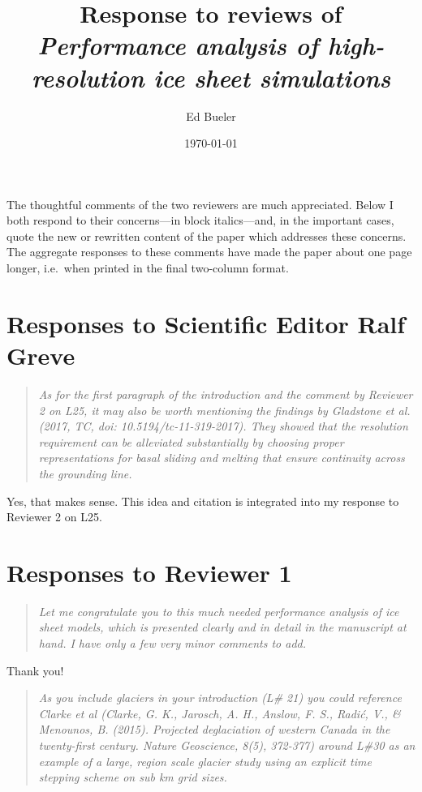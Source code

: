 \documentclass[letterpaper,final,12pt,reqno]{amsart}
\newenvironment{review}%
{\bigskip \par \begin{quote} \selectfont \sl}%
{\end{quote}}
\begin{document}
\title{Response to reviews of \emph{Performance analysis of high-resolution ice sheet simulations}}

\author{Ed Bueler}

\date{\today}

\maketitle


\thispagestyle{empty}

The thoughtful comments of the two reviewers are much appreciated.  Below I both respond to their concerns---in block italics---and, in the important cases, quote the new or rewritten content of the paper which addresses these concerns.  The aggregate responses to these comments have made the paper about one page longer, i.e.~when printed in the final two-column format.

\section{Responses to Scientific Editor Ralf Greve}

\begin{review}
As for the first paragraph of the introduction and the comment by Reviewer 2 on L25, it may also be worth mentioning the findings by Gladstone et al. (2017, TC, doi: 10.5194/tc-11-319-2017). They showed that the resolution requirement can be alleviated substantially by choosing proper representations for basal sliding and melting that ensure continuity across the grounding line.
\end{review}

\noindent Yes, that makes sense.  This idea and citation is integrated into my response to Reviewer 2 on L25.


\section{Responses to Reviewer 1}

\begin{review}
Let me congratulate you to this much needed performance analysis of ice sheet models, which is presented clearly and in detail in the manuscript at hand. I have only a few very minor comments to add.
\end{review}

\noindent Thank you!

\begin{review}
As you include glaciers in your introduction (L\# 21) you could reference Clarke et al (Clarke, G. K., Jarosch, A. H., Anslow, F. S., Radić, V., \& Menounos, B. (2015). Projected deglaciation of western Canada in the twenty-first century. Nature Geoscience, 8(5), 372-377) around L\#30 as an example of a large, region scale glacier study using an explicit time stepping scheme on sub km grid sizes.
\end{review}
\end{document}
